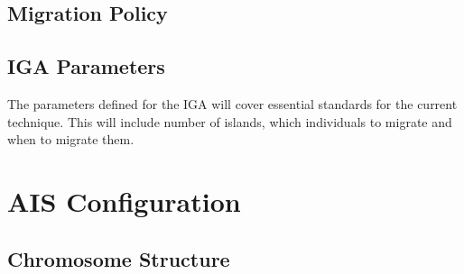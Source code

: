

\subsection{Migration Policy}

\subsection{IGA Parameters}
The parameters defined for the IGA will cover essential standards for the current technique. This will include number of islands, which individuals to migrate and when to migrate them. 


\section{AIS Configuration}

\subsection{Chromosome Structure}

